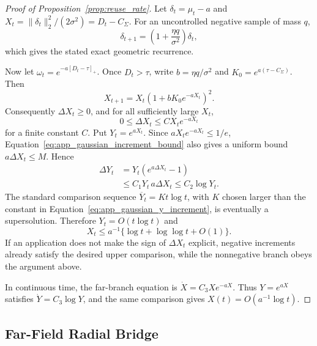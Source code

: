 \documentclass{article}
\theoremstyle{plain}
\theoremstyle{definition}
\theoremstyle{remark}
\begin{document}
\begin{proof}[Proof of Proposition~\ref{prop:reuse_rate}]
Let \(\delta_t=\mu_t-a\) and
\(X_t=\|\delta_t\|_2^2/(2\sigma^2)=D_t-C_\Sigma\).
For an uncontrolled negative sample of mass \(q\),
\[
\delta_{t+1}
=\left(1+\frac{\eta q}{\sigma^2}\right)\delta_t,
\]
which gives the stated exact geometric recurrence.

Now let \(\omega_t=e^{-a[D_t-\tau]_+}\). Once
\(D_t>\tau\), write
\(b=\eta q/\sigma^2\) and
\(K_0=e^{a(\tau-C_\Sigma)}\). Then
\begin{equation}
X_{t+1}=X_t\left(1+bK_0e^{-aX_t}\right)^2.
\label{eq:app_tapered_gaussian_recurrence}
\end{equation}
Consequently \(\Delta X_t\ge0\), and for all sufficiently large
\(X_t\),
\begin{equation}
0\le\Delta X_t\le C X_te^{-aX_t}
\label{eq:app_gaussian_increment_bound}
\end{equation}
for a finite constant \(C\). Put \(Y_t=e^{aX_t}\). Since
\(aX_te^{-aX_t}\le1/e\),
Equation~\eqref{eq:app_gaussian_increment_bound} also gives a uniform
bound \(a\Delta X_t\le M\). Hence
\begin{align}
\Delta Y_t
&=Y_t(e^{a\Delta X_t}-1) \\
&\le C_1Y_t\,a\Delta X_t
\le C_2\log Y_t.
\label{eq:app_gaussian_y_increment}
\end{align}
The standard comparison sequence
\(\overline Y_t=K t\log t\), with \(K\) chosen larger than the
constant in Equation~\eqref{eq:app_gaussian_y_increment}, is eventually
a supersolution. Therefore
\(Y_t=O(t\log t)\) and
\[
X_t\le a^{-1}\{\log t+\log\log t+O(1)\}.
\]
If an application does not make the sign of \(\Delta X_t\) explicit,
negative increments already satisfy the desired upper comparison, while
the nonnegative branch obeys the argument above.

In continuous time, the far-branch equation is
\(\dot X=C_3Xe^{-aX}\). Thus
\(Y=e^{aX}\) satisfies \(\dot Y=C_3\log Y\), and the same comparison
gives \(X(t)=O(a^{-1}\log t)\).
\end{proof}

\subsection{Far-Field Radial Bridge}
\label{app:far_field_bridge}
\end{document}
